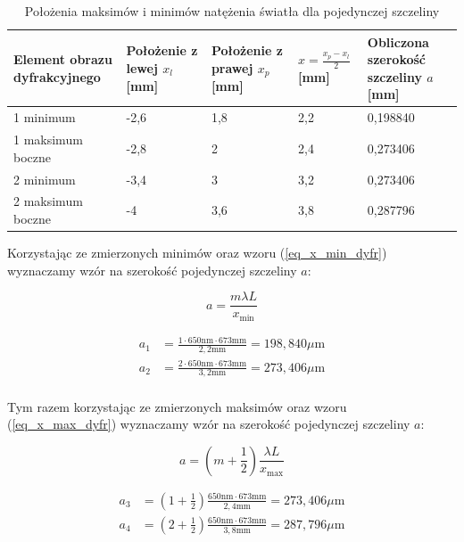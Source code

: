 \documentclass{fizykalab}
\newcommand{\nm}{\ensuremath{\text{nm}}}
\newcommand{\mm}{\ensuremath{\text{mm}}}
\newcommand{\um}{\ensuremath{\mu \text{m}}}
\begin{document}
\begin{table}[H]
    \centering
    \caption{Położenia maksimów i minimów natężenia światła dla 
    pojedynczej szczeliny
    }
    \begin{tabular}{|C{3.5cm}|C{2cm} | C{2cm}| C{2cm} |C{2cm}|}
        \hline
         Element obrazu dyfrakcyjnego&
         Położenie z lewej $x_l$ [mm]&
         Położenie z prawej $x_p$ [mm]& 
         $x = \frac{x_p - x_l}{2}$ [mm]& 
         Obliczona szerokość szczeliny $a$ [mm]
         
         \\  minimum  &
         -2,6 & 1,8 & 2,2 & 0,198840 \\  maksimum boczne &
         -2,8 & 2 & 2,4 & 0,273406\\  minimum &
         -3,4 & 3 & 3,2 & 0,273406 \\  maksimum boczne&
         
         -4 & 3,6 & 3,8 & 0,287796 \\ \hline
    \end{tabular}
    \label{tab:my_label}
\end{table}

Korzystając ze zmierzonych minimów oraz wzoru (\ref{eq_x_min_dyfr}) wyznaczamy wzór na 
szerokość pojedynczej szczeliny $a$:

\begin{equation}
    a = \frac{m \lambda L} {x_\text{min}}
\end{equation}

\begin{align*}
    a_1 &= \frac{1 \cdot 650 \nm  \cdot 673 \mm}{2,2 \mm} = 198,840 \um \\
    a_2 &= \frac{2 \cdot 650 \nm  \cdot 673 \mm}{3,2 \mm} = 273,406 \um \\
\end{align*}

Tym razem korzystając ze zmierzonych maksimów oraz wzoru (\ref{eq_x_max_dyfr}) wyznaczamy wzór na 
szerokość pojedynczej szczeliny $a$:

\begin{equation}
    a = \left(m + \frac{1}{2}\right) \frac{\lambda L} {x_\text{max}}
\end{equation}

\begin{align*}
    a_3 &= \left(1 + \frac{1}{2}\right) \frac{650 \nm \cdot 673 \mm} {2,4 \mm} = 273,406 \um \\
    a_4 &= \left(2 + \frac{1}{2}\right) \frac{650 \nm \cdot 673 \mm} {3,8 \mm} = 287,796 \um \\
\end{align*}
\end{document}
